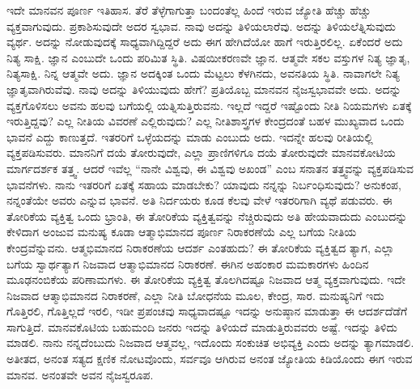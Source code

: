 ಇದೇ ಮಾನವನ ಪೂರ್ಣ ಇತಿಹಾಸ. ತೆರೆ ತೆಳ್ಳೆಗಾಗುತ್ತಾ ಬಂದಂತೆಲ್ಲ ಹಿಂದೆ ಇರುವ ಜ್ಯೋತಿ ಹೆಚ್ಚು ಹೆಚ್ಚು ವ್ಯಕ್ತವಾಗುವುದು. ಪ್ರಕಾಶಿಸುವುದೇ ಅದರ ಸ್ವಭಾವ. ನಾವು ಅದನ್ನು ತಿಳಿಯಲಾರೆವು. ಅದನ್ನು ತಿಳಿಯಲೆತ್ನಿಸುವುದು ವ್ಯರ್ಥ. ಅದನ್ನು ನೋಡುವುದಕ್ಕೆ ಸಾಧ್ಯವಾಗಿದ್ದಿದ್ದರೆ ಅದು ಈಗ ಹೇಗಿದೆಯೋ ಹಾಗೆ ಇರುತ್ತಿರಲಿಲ್ಲ. ಏಕೆಂದರೆ ಅದು ನಿತ್ಯ ಸಾಕ್ಷಿ. ಜ್ಞಾನ ಎಂಬುದೇ ಒಂದು ಪರಿಮಿತ ಸ್ಥಿತಿ. ವಿಷಯೀಕರಣವೇ ಜ್ಞಾನ. ಆತ್ಮವೇ ಸಕಲ ವಸ್ತುಗಳ ನಿತ್ಯ ಜ್ಞಾತೃ, ನಿತ್ಯಸಾಕ್ಷಿ. ನಿನ್ನ ಆತ್ಮವೇ ಅದು. ಜ್ಞಾನ ಅದಕ್ಕಿಂತ ಒಂದು ಮೆಟ್ಟಲು ಕೆಳಗಿನದು, ಅವನತಿಯ ಸ್ಥಿತಿ. ನಾವಾಗಲೇ ನಿತ್ಯ ಜ್ಞಾತೃವಾಗಿರುವೆವು. ನಾವು ಅದನ್ನು ತಿಳಿಯುವುದು ಹೇಗೆ? ಪ್ರತಿಯೊಬ್ಬ ಮಾನವನ ನೈಜಸ್ವಭಾವವೇ ಅದು. ಅದನ್ನು ವ್ಯಕ್ತಗೊಳಿಸಲು ಅವನು ಹಲವು ಬಗೆಯಲ್ಲಿ ಯತ್ನಿಸುತ್ತಿರುವನು. ಇಲ್ಲದೆ ಇದ್ದರೆ ಇಷ್ಟೊಂದು ನೀತಿ ನಿಯಮಗಳು ಏತಕ್ಕೆ ಇರುತ್ತಿದ್ದವು? ಎಲ್ಲ ನೀತಿಯ ವಿವರಣೆ ಎಲ್ಲಿರುವುದು? ಎಲ್ಲ ನೀತಿಶಾಸ್ತ್ರಗಳ ಕೇಂದ್ರದಂತೆ ಬಹಳ ಮುಖ್ಯವಾದ ಒಂದು ಭಾವನೆ ಎದ್ದು ಕಾಣುತ್ತದೆ. ಇತರರಿಗೆ ಒಳ್ಳೆಯದನ್ನು ಮಾಡು ಎಂಬುದು ಅದು. ಇದನ್ನೇ ಹಲವು ರೀತಿಯಲ್ಲಿ ವ್ಯಕ್ತಪಡಿಸುವರು. ಮಾನನಿಗೆ ದಯೆ ತೋರುವುದೇ, ಎಲ್ಲಾ ಪ್ರಾಣಿಗಳಿಗೂ ದಯೆ ತೋರುವುದೇ ಮಾನವಕೋಟಿಯ ಮಾರ್ಗದರ್ಶಕ ತತ್ತ್ವ. ಆದರೆ ಇವೆಲ್ಲ “ನಾನೇ ವಿಶ್ವವು, ಈ ವಿಶ್ವವು ಅಖಂಡ” ಎಂಬ ಸನಾತನ ತತ್ತ್ವವನ್ನು ವ್ಯಕ್ತಪಡಿಸುವ ಭಾವನೆಗಳು. ನಾನು ಇತರರಿಗೆ ಏತಕ್ಕೆ ಸಹಾಯ ಮಾಡಬೇಕು? ಯಾವುದು ನನ್ನನ್ನು ನಿರ್ಬಂಧಿಸುವುದು? ಅನುಕಂಪ, ನನ್ನಂತೆಯೇ ಅವರು ಎನ್ನುವ ಭಾವನೆ. ಅತಿ ನಿರ್ದಯರು ಕೂಡ ಕೆಲವು ವೇಳೆ ಇತರರಿಗಾಗಿ ವ್ಯಥೆ ಪಡುವರು. ಈ ತೋರಿಕೆಯ ವ್ಯಕ್ತಿತ್ವ ಒಂದು ಭ್ರಾಂತಿ, ಈ ತೋರಿಕೆಯ ವ್ಯಕ್ತಿತ್ವವನ್ನು ನೆಚ್ಚಿರುವುದು ಅತಿ ಹೇಯವಾದುದು ಎಂಬುದನ್ನು ಕೇಳಿದಾಗ ಅಂಜುವ ಮನುಷ್ಯ ಕೂಡಾ ಆತ್ಮಾಭಿಮಾನದ ಪೂರ್ಣ ನಿರಾಕರಣೆಯೆ ಎಲ್ಲ ಬಗೆಯ ನೀತಿಯ ಕೇಂದ್ರವೆನ್ನುವನು. ಆತ್ಮಭಿಮಾನದ ನಿರಾಕರಣೆಯ ಆದರ್ಶ ಎಂತಹುದು? ಈ ತೋರಿಕೆಯ ವ್ಯಕ್ತಿತ್ವದ ತ್ಯಾಗ, ಎಲ್ಲಾ ಬಗೆಯ ಸ್ವಾರ್ಥತ್ಯಾಗ ನಿಜವಾದ ಆತ್ಮಾಭಿಮಾನದ ನಿರಾಕರಣೆ. ಈಗಿನ ಅಹಂಕಾರ ಮಮಕಾರಗಳು ಹಿಂದಿನ ಮೂಢನಂಬಿಕೆಯ ಪರಿಣಾಮಗಳು. ಈ ತೋರಿಕೆಯ ವ್ಯಕ್ತಿತ್ವ ತೊಲಗಿದಷ್ಟೂ ನಿಜವಾದ ಆತ್ಮ ವ್ಯಕ್ತವಾಗುವುದು. ಇದೇ ನಿಜವಾದ ಆತ್ಮಾಭಿಮಾನದ ನಿರಾಕರಣೆ, ಎಲ್ಲಾ ನೀತಿ ಬೋಧನೆಯ ಮೂಲ, ಕೇಂದ್ರ, ಸಾರ. ಮನುಷ್ಯನಿಗೆ ಇದು ಗೊತ್ತಿರಲಿ, ಗೊತ್ತಿಲ್ಲದೆ ಇರಲಿ, ಇಡೀ ಪ್ರಪಂಚವು ಸಾಧ್ಯವಾದಷ್ಟೂ ಇದನ್ನು ಅನುಷ್ಠಾನ ಮಾಡುತ್ತಾ ಈ ಆದರ್ಶದೆಡೆಗೆ ಸಾಗುತ್ತಿದೆ. ಮಾನವಕೊಟಿಯ ಬಹುಮಂದಿ ಜನರು ಇದನ್ನು ತಿಳಿಯದೆ ಮಾಡುತ್ತಿರುವವರು ಅಷ್ಟೆ. ಇದನ್ನು ತಿಳಿದು ಮಾಡಲಿ. ನಾನು ನನ್ನದೆಂಬುದು ನಿಜವಾದ ಆತ್ಮವಲ್ಲ, ಇದೊಂದು ಸಂಕುಚಿತ ಅಭಿವ್ಯಕ್ತಿ ಎಂದು ಅದನ್ನು ತ್ಯಾಗಮಾಡಲಿ. ಅತೀತದ, ಅನಂತ ಸತ್ಯದ ಕ್ಷಣಿಕ ನೋಟವೊಂದು, ಸರ್ವವೂ ಆಗಿರುವ ಅನಂತ ಜ್ಯೋತಿಯ ಕಿಡಿಯೊಂದು ಈಗ ಇರುವ ಮಾನವ. ಅನಂತವೇ ಅವನ ನೈಜಸ್ವರೂಪ.

